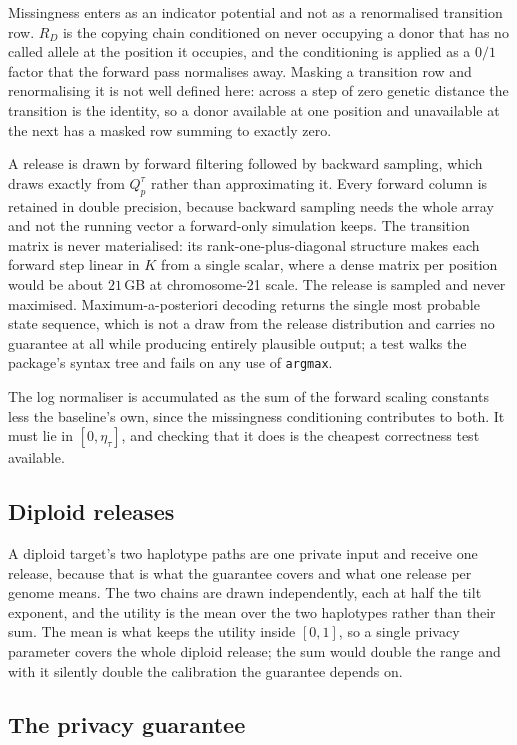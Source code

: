 Missingness enters as an indicator potential and not as a renormalised transition
row. $R_D$ is the copying chain conditioned on never occupying a donor that has no
called allele at the position it occupies, and the conditioning is applied as a
$0/1$ factor that the forward pass normalises away. Masking a transition row and
renormalising it is not well defined here: across a step of zero genetic distance the
transition is the identity, so a donor available at one position and unavailable at
the next has a masked row summing to exactly zero.

A release is drawn by forward filtering followed by backward sampling, which draws
exactly from $Q^{\tau}_{p}$ rather than approximating it. Every forward column is
retained in double precision, because backward sampling needs the whole array and not
the running vector a forward-only simulation keeps. The transition matrix is never
materialised: its rank-one-plus-diagonal structure makes each forward step linear in
$K$ from a single scalar, where a dense matrix per position would be about
$21$\,GB at chromosome-21 scale. The release is sampled and never maximised.
Maximum-a-posteriori decoding returns the single most probable state sequence, which
is not a draw from the release distribution and carries no guarantee at all while
producing entirely plausible output; a test walks the package's syntax tree and fails
on any use of \texttt{argmax}.

The log normaliser is accumulated as the sum of the forward scaling constants less
the baseline's own, since the missingness conditioning contributes to both. It must
lie in $[0, \eta_\tau]$, and checking that it does is the cheapest correctness test
available.

\subsection{Diploid releases}

A diploid target's two haplotype paths are one private input and receive one release,
because that is what the guarantee covers and what one release per genome means. The
two chains are drawn independently, each at half the tilt exponent, and the utility
is the mean over the two haplotypes rather than their sum. The mean is what keeps the
utility inside $[0,1]$, so a single privacy parameter covers the whole diploid
release; the sum would double the range and with it silently double the calibration
the guarantee depends on.

\subsection{The privacy guarantee}


